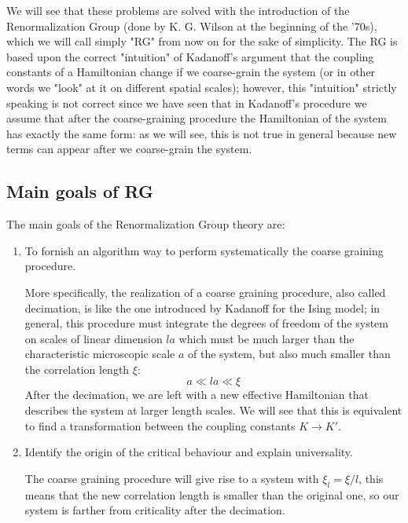 \documentclass[../main/main.tex]{subfiles}
\begin{document}
We will see that these problems are solved with the introduction of the Renormalization Group (done by K. G. Wilson at the beginning of the '70s), which we will call simply "RG" from now on for the sake of simplicity. The RG is based upon the correct "intuition" of Kadanoff's argument that the coupling constants of a Hamiltonian change if we coarse-grain the system (or in other words we "look" at it on different spatial scales); however, this "intuition" strictly speaking is not correct since we have seen that in Kadanoff's procedure we assume that after the coarse-graining procedure the Hamiltonian of the system has exactly the same form: as we will see, this is not true in general because new terms can appear after we coarse-grain the system.

\subsection{Main goals of RG}
The main goals of the Renormalization Group theory are:
\begin{enumerate}
\item To fornish an algorithm way to perform systematically the coarse graining procedure.

More specifically, the realization of a coarse graining procedure, also called decimation, is like the one introduced by Kadanoff for the Ising model; in general, this procedure must integrate the degrees of freedom of the system on scales of linear dimension \( la \)  which must be much larger than the characteristic microscopic scale \( a \) of the system, but also much smaller than the correlation length \( \xi  \):
\begin{equation*}
  a \ll la \ll \xi
\end{equation*}
 After the decimation, we are left with a new effective Hamiltonian that describes the system at larger length scales. We will see that this is equivalent to find a transformation between the coupling constants \( K \rightarrow K' \).

\item Identify the origin of the critical behaviour and explain universality.

The coarse graining procedure will give rise to a system with \( \xi_l = \xi /l \),
this means that the new correlation length is smaller than the original one, so our system is farther from criticality after the decimation.

\end{enumerate}
\end{document}
